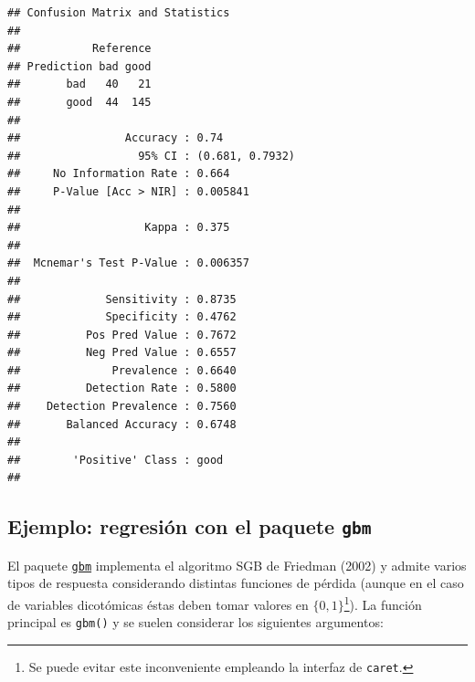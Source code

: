 \documentclass[
]{book}
\newenvironment{Shaded}{\begin{snugshade}}{\end{snugshade}}
\newcommand{\DataTypeTok}[1]{\textcolor[rgb]{0.13,0.29,0.53}{#1}}
\newcommand{\KeywordTok}[1]{\textcolor[rgb]{0.13,0.29,0.53}{\textbf{#1}}}
\newcommand{\NormalTok}[1]{#1}
\newcommand{\OperatorTok}[1]{\textcolor[rgb]{0.81,0.36,0.00}{\textbf{#1}}}
\newcommand{\StringTok}[1]{\textcolor[rgb]{0.31,0.60,0.02}{#1}}
\theoremstyle{break}
\theoremstyle{definition}
\theoremstyle{definition}
\theoremstyle{definition}
\theoremstyle{remark}
\begin{document}
\begin{Shaded}
\end{Shaded}

\begin{verbatim}
## Confusion Matrix and Statistics
## 
##           Reference
## Prediction bad good
##       bad   40   21
##       good  44  145
##                                          
##                Accuracy : 0.74           
##                  95% CI : (0.681, 0.7932)
##     No Information Rate : 0.664          
##     P-Value [Acc > NIR] : 0.005841       
##                                          
##                   Kappa : 0.375          
##                                          
##  Mcnemar's Test P-Value : 0.006357       
##                                          
##             Sensitivity : 0.8735         
##             Specificity : 0.4762         
##          Pos Pred Value : 0.7672         
##          Neg Pred Value : 0.6557         
##              Prevalence : 0.6640         
##          Detection Rate : 0.5800         
##    Detection Prevalence : 0.7560         
##       Balanced Accuracy : 0.6748         
##                                          
##        'Positive' Class : good           
## 
\end{verbatim}

\hypertarget{ejemplo-regresiuxf3n-con-el-paquete-gbm}{%
\subsection{\texorpdfstring{Ejemplo: regresión con el paquete \texttt{gbm}}{Ejemplo: regresión con el paquete gbm}}\label{ejemplo-regresiuxf3n-con-el-paquete-gbm}}

El paquete \href{https://CRAN.R-project.org/package=gbm}{\texttt{gbm}} implementa el algoritmo SGB de Friedman (2002) y admite varios tipos de respuesta considerando distintas funciones de pérdida (aunque en el caso de variables dicotómicas éstas deben tomar valores en \(\{0, 1\}\)\footnote{Se puede evitar este inconveniente empleando la interfaz de \texttt{caret}.}).
La función principal es \texttt{gbm()} y se suelen considerar los siguientes argumentos:
\end{document}
